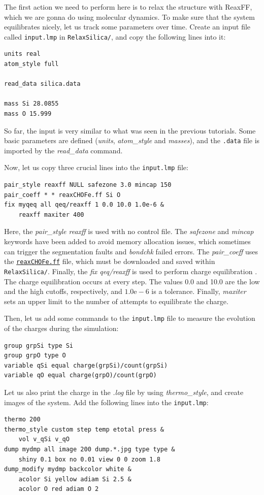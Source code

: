 \documentclass[9pt,tutorial]{livecoms}
\newcommand{\flrcmd}[1]{\textcolor{command}{\texttt{#1}}} %
\newcommand{\flecmd}[1]{\textcolor{command}{\texttt{#1}}} %
\newcommand{\dwlcmd}[1]{\textcolor{download}{\texttt{#1}}} %
\newcommand{\filepath}{https://raw.githubusercontent.com/lammpstutorials/lammpstutorials-article/main/files/}
\begin{document}
The first action we need to perform here is to relax the structure with ReaxFF,
which we are gonna do using molecular dynamics. To make sure that the system
equilibrates nicely, let us track some parameters over time. Create an input
file called \flecmd{input.lmp} in \flrcmd{RelaxSilica/}, and copy the following
lines into it:
\begin{lstlisting}
units real
atom_style full

read_data silica.data

mass Si 28.0855
mass O 15.999
\end{lstlisting}
So far, the input is very similar to what was seen in the previous tutorials.
Some basic parameters are defined (\textit{units}, \textit{atom\_style} and \textit{masses}),
and the \flecmd{.data} file is imported by the \textit{read\_data} command.

Now, let us copy three crucial lines into the \flecmd{input.lmp} file:
\begin{lstlisting}
pair_style reaxff NULL safezone 3.0 mincap 150
pair_coeff * * reaxCHOFe.ff Si O
fix myqeq all qeq/reaxff 1 0.0 10.0 1.0e-6 &
    reaxff maxiter 400
\end{lstlisting}
Here, the \textit{pair\_style reaxff} is used with no control file. The
\textit{safezone} and \textit{mincap} keywords have been added to avoid memory
allocation issues, which sometimes can trigger the segmentation faults and
\textit{bondchk} failed errors. The \textit{pair\_coeff} uses the
\href{\filepath tutorial5/reaxCHOFe.ff}{\dwlcmd{reaxCHOFe.ff}}
file, which must be downloaded and saved within \flrcmd{RelaxSilica/}. Finally, the
\textit{fix qeq/reaxff} is used to perform charge equilibration \cite{rappe1991charge}.
The charge equilibration occurs at every step. The values 0.0 and 10.0 are the
low and the high cutoffs, respectively, and $1.0 \text{e} -6$ is a tolerance.
Finally, \textit{maxiter} sets an upper limit to the number of attempts to
equilibrate the charge.

Then, let us add some commands to the \flecmd{input.lmp} file  to measure the
evolution of the charges during the simulation:
\begin{lstlisting}
group grpSi type Si
group grpO type O
variable qSi equal charge(grpSi)/count(grpSi)
variable qO equal charge(grpO)/count(grpO)
\end{lstlisting}
Let us also print the charge in the \textit{.log} file by using \textit{thermo\_style},
and create images of the system. Add the following lines into the \flecmd{input.lmp}:
\begin{lstlisting}
thermo 200
thermo_style custom step temp etotal press &
    vol v_qSi v_qO
dump mydmp all image 200 dump.*.jpg type type &
    shiny 0.1 box no 0.01 view 0 0 zoom 1.8
dump_modify mydmp backcolor white &
    acolor Si yellow adiam Si 2.5 &
    acolor O red adiam O 2
\end{lstlisting}
\end{document}
